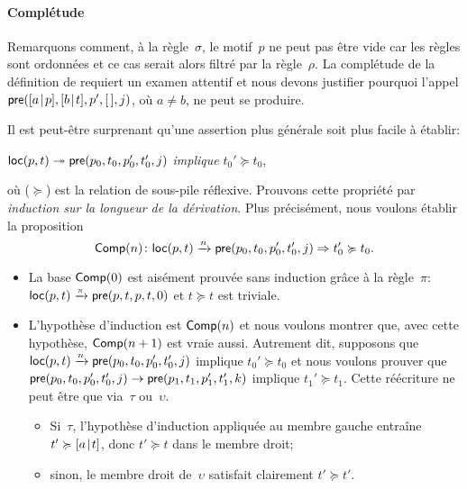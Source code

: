 \paragraph{Complétude}

Remarquons comment, à la règle~\(\sigma\), le motif~\(p\) ne peut pas
être vide car les règles sont ordonnées et ce cas serait alors filtré
par la règle~\(\rho\). La complétude de la définition de 
requiert un examen attentif et nous devons justifier pourquoi l'appel
\(\textsf{pre}([{a}\!\mid\!{p}],[{b}\!\mid\!{t}],p',[\,],j)\), où \(a \neq b\), ne
peut se produire.

Il est peut-être surprenant qu'une assertion plus générale soit plus
facile à établir:
\begin{center}
\(\textsf{loc}(p,t) \twoheadrightarrow \textsf{pre}(p_0,t_0,p_0',t_0',j)\)
\textsl{implique} \(t_0' \succcurlyeq t_0\),
\end{center}
où (\(\succcurlyeq\)) est la relation de sous-pile réflexive. 
Prouvons cette propriété par \emph{induction sur la longueur de la
  dérivation}. Plus précisément, nous voulons établir la proposition
\begin{equation*}
\pred{Comp}{n} \colon \fun{loc}(p,t) \xrightarrow{\smash{n}}
\fun{pre}(p_0,t_0,p_0',t_0',j) \Rightarrow t_0' \succcurlyeq t_0.
\index{Comp@\predName{Comp}}
\end{equation*}
\begin{itemize}

  \item La base \(\textsf{Comp}({0})\) est aisément prouvée sans induction
  grâce à la règle~\(\pi\): \(\textsf{loc}(p,t) \xrightarrow{\smash{\pi}}
  \textsf{pre}(p,t,p,t,0)\) et \(t \succcurlyeq t\) est triviale.

  \item L'hypothèse d'induction est \(\textsf{Comp}({n})\) et nous voulons
  montrer que, avec cette hypothèse, \(\textsf{Comp}({n+1})\) est vraie
  aussi. Autrement dit, supposons que \(\textsf{loc}(p,t)
  \xrightarrow{\smash{n}} \textsf{pre}(p_0,t_0,p_0',t_0',j)\) implique
  \(t_0' \succcurlyeq t_0\) et nous voulons prouver que
  \(\textsf{pre}(p_0,t_0,p_0',t_0',j) \rightarrow
  \textsf{pre}(p_1,t_1,p_1',t_1',k)\) implique \(t_1' \succcurlyeq
  t_1\). Cette réécriture ne peut être que via~\(\tau\)
  ou~\(\upsilon\).
  \begin{itemize}

    \item Si~\(\tau\), l'hypothèse d'induction appliquée au membre
    gauche entraîne \(t' \succcurlyeq [{a}\!\mid\!{t}]\), donc \(t'
    \succcurlyeq t\) dans le membre droit;

    \item sinon, le membre droit de~\(\upsilon\) satisfait clairement
    \(t' \succcurlyeq t'\).

      \end{itemize}
\end{itemize}
